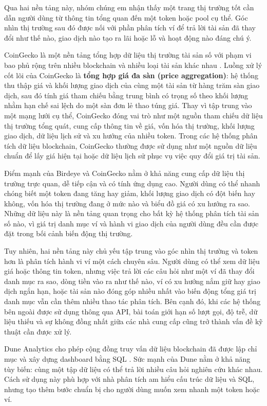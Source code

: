 Qua hai nền tảng này, nhóm chúng em nhận thấy một trang thị trường tốt cần dẫn người dùng từ thông tin tổng quan đến một token hoặc pool cụ thể. Góc nhìn thị trường sau đó được nối với phần phân tích ví để trả lời tài sản đã thay đổi như thế nào, giao dịch nào tạo ra lãi hoặc lỗ và hoạt động nào đáng chú ý.

CoinGecko là một nền tảng tổng hợp dữ liệu thị trường tài sản số với phạm vi bao phủ rộng trên nhiều blockchain và nhiều loại tài sản khác nhau \cite{coingecko}. Luồng xử lý cốt lõi của CoinGecko là \textbf{tổng hợp giá đa sàn (price aggregation)}: hệ thống thu thập giá và khối lượng giao dịch của cùng một tài sản từ hàng trăm sàn giao dịch, sau đó tính giá tham chiếu bằng trung bình có trọng số theo khối lượng nhằm hạn chế sai lệch do một sàn đơn lẻ thao túng giá. Thay vì tập trung vào một mạng lưới cụ thể, CoinGecko đóng vai trò như một nguồn tham chiếu dữ liệu thị trường tổng quát, cung cấp thông tin về giá, vốn hóa thị trường, khối lượng giao dịch, dữ liệu lịch sử và xu hướng của nhiều token. Trong các hệ thống phân tích dữ liệu blockchain, CoinGecko thường được sử dụng như một nguồn dữ liệu chuẩn để lấy giá hiện tại hoặc dữ liệu lịch sử phục vụ việc quy đổi giá trị tài sản.

Điểm mạnh của Birdeye và CoinGecko nằm ở khả năng cung cấp dữ liệu thị trường trực quan, dễ tiếp cận và có tính ứng dụng cao. Người dùng có thể nhanh chóng biết một token đang tăng hay giảm, khối lượng giao dịch có đột biến hay không, vốn hóa thị trường đang ở mức nào và biểu đồ giá có xu hướng ra sao. Những dữ liệu này là nền tảng quan trọng cho bất kỳ hệ thống phân tích tài sản số nào, vì giá trị danh mục ví và hành vi giao dịch của người dùng đều cần được đặt trong bối cảnh biến động thị trường.

Tuy nhiên, hai nền tảng này chủ yếu tập trung vào góc nhìn thị trường và token hơn là phân tích hành vi ví một cách chuyên sâu. Người dùng có thể xem dữ liệu giá hoặc thông tin token, nhưng việc trả lời các câu hỏi như một ví đã thay đổi danh mục ra sao, dòng tiền vào ra như thế nào, ví có xu hướng nắm giữ hay giao dịch ngắn hạn, hoặc tài sản nào đóng góp nhiều nhất vào biến động tổng giá trị danh mục vẫn cần thêm nhiều thao tác phân tích. Bên cạnh đó, khi các hệ thống bên ngoài được sử dụng thông qua API, bài toán giới hạn số lượt gọi, độ trễ, dữ liệu thiếu và sự không đồng nhất giữa các nhà cung cấp cũng trở thành vấn đề kỹ thuật cần được xử lý.

Dune Analytics cho phép cộng đồng truy vấn dữ liệu blockchain đã được lập chỉ mục và xây dựng dashboard bằng SQL \cite{dune}. Sức mạnh của Dune nằm ở khả năng tùy biến: cùng một tập dữ liệu có thể trả lời nhiều câu hỏi nghiên cứu khác nhau. Cách sử dụng này phù hợp với nhà phân tích am hiểu cấu trúc dữ liệu và SQL, nhưng tạo thêm bước chuẩn bị cho người dùng muốn xem nhanh một token hoặc ví.

